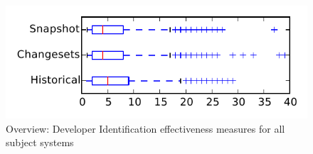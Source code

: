 
\begin{figure}
\centering
\includegraphics[height=0.4\textheight]{figures/dit/all_tiny}
\caption{Overview: Developer Identification effectiveness measures for all subject systems}
\label{fig:dit:all:tiny}
\end{figure}
